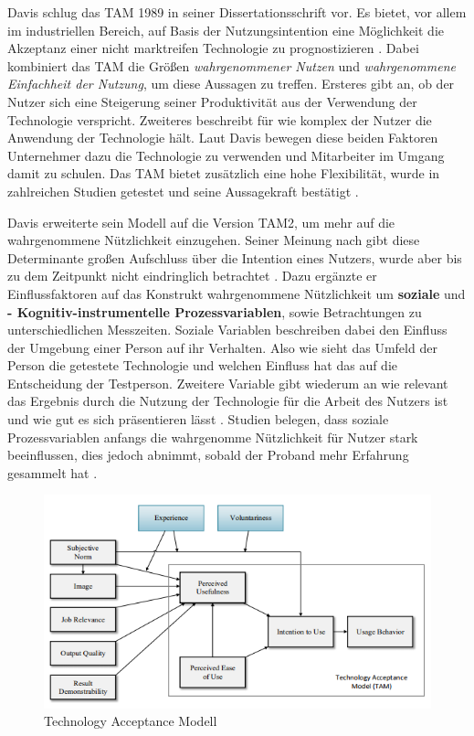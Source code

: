 Davis schlug das TAM 1989 in seiner Dissertationsschrift vor. Es bietet, vor allem im industriellen Bereich, auf Basis der Nutzungsintention eine Möglichkeit die Akzeptanz einer nicht marktreifen Technologie zu prognostizieren \cite{wilhelm_nutzerakzeptanz_nodate}. Dabei kombiniert das TAM die Größen \textit{wahrgenommener Nutzen} und \textit{wahrgenommene Einfachheit der Nutzung}, um diese Aussagen zu treffen. Ersteres gibt an, ob der Nutzer sich eine Steigerung seiner Produktivität aus der Verwendung der Technologie verspricht. Zweiteres beschreibt für wie komplex der Nutzer die Anwendung der Technologie hält. Laut Davis bewegen diese beiden Faktoren Unternehmer dazu die Technologie zu verwenden und Mitarbeiter im Umgang damit zu schulen. Das TAM bietet zusätzlich eine hohe Flexibilität, wurde in zahlreichen Studien getestet und seine Aussagekraft bestätigt \cite{university_of_arkansas_dead_2007}.

Davis erweiterte sein Modell auf die Version TAM2, um mehr auf die wahrgenommene Nützlichkeit einzugehen. Seiner Meinung nach gibt diese Determinante großen Aufschluss über die Intention eines Nutzers, wurde aber bis zu dem Zeitpunkt nicht eindringlich betrachtet \cite{venkatesh_model_1996}. Dazu ergänzte er Einflussfaktoren auf das Konstrukt wahrgenommene Nützlichkeit um \textbf{soziale} und \textbf{-	Kognitiv-instrumentelle Prozessvariablen}, sowie Betrachtungen zu unterschiedlichen Messzeiten. Soziale Variablen beschreiben dabei den Einfluss der Umgebung einer Person auf ihr Verhalten. Also wie sieht das Umfeld der Person die getestete Technologie und welchen Einfluss hat das auf die Entscheidung der Testperson. Zweitere Variable gibt wiederum an wie relevant das Ergebnis durch die Nutzung der Technologie für die Arbeit des Nutzers ist und wie gut es sich präsentieren lässt \cite{venkatesh_theoretical_2000}. Studien belegen, dass soziale Prozessvariablen anfangs die wahrgenomme Nützlichkeit für Nutzer stark beeinflussen, dies jedoch abnimmt, sobald der Proband mehr Erfahrung gesammelt hat \cite{galli_technologieakzeptanz_2016}.

\begin{figure}[h]
\begin{center}
\noindent\includegraphics[width=\linewidth,height=\textheight,keepaspectratio]{Resources/TAM.png}
\caption{Technology Acceptance Modell}
\end{center}
\end{figure}



